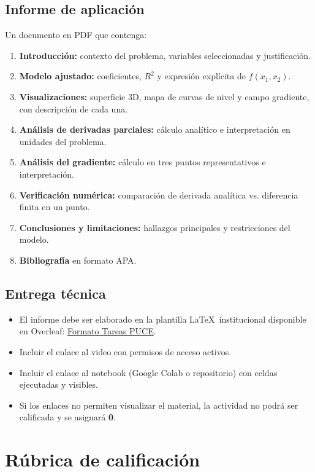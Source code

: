 \documentclass[a4,11pt]{aleph-notas}
\begin{document}
\subsection{Informe de aplicación}
Un documento en PDF que contenga:
\begin{enumerate}[leftmargin=*, label={\textbf{\arabic*.}}]
    \item \textbf{Introducción:} contexto del problema, variables seleccionadas y justificación.
    \item \textbf{Modelo ajustado:} coeficientes, $R^2$ y expresión explícita de $f(x_1, x_2)$.
    \item \textbf{Visualizaciones:} superficie 3D, mapa de curvas de nivel y campo gradiente, con descripción de cada una.
    \item \textbf{Análisis de derivadas parciales:} cálculo analítico e interpretación en unidades del problema.
    \item \textbf{Análisis del gradiente:} cálculo en tres puntos representativos e interpretación.
    \item \textbf{Verificación numérica:} comparación de derivada analítica vs. diferencia finita en un punto.
    \item \textbf{Conclusiones y limitaciones:} hallazgos principales y restricciones del modelo.
    \item \textbf{Bibliografía} en formato APA.
\end{enumerate}

\subsection{Entrega técnica}
\begin{itemize}[leftmargin=*]
    \item El informe debe ser elaborado en la plantilla \LaTeX\ institucional disponible en Overleaf: \href{https://www.overleaf.com/latex/templates/formato-tareas-puce/nkgwqjtcrvms}{Formato Tareas PUCE}.
    \item Incluir el enlace al video con permisos de acceso activos.
    \item Incluir el enlace al notebook (Google Colab o repositorio) con celdas ejecutadas y visibles.
    \item Si los enlaces no permiten visualizar el material, la actividad no podrá ser calificada y se asignará \textbf{0}.
\end{itemize}


\section{Rúbrica de calificación}
\end{document}
